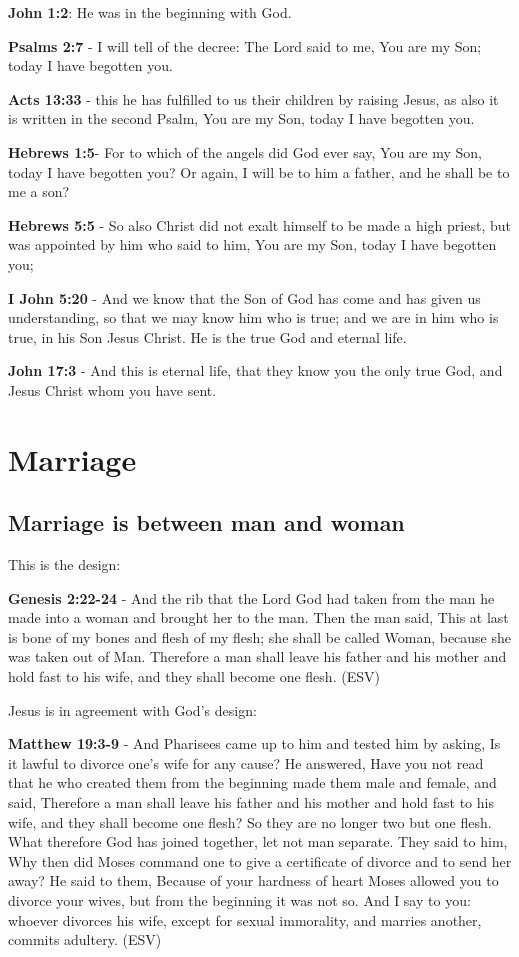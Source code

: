 \documentclass[11pt]{article}
\begin{document}
\textbf{John 1:2}: He was in the beginning with God.

\textbf{Psalms 2:7} - I will tell of the decree: The Lord said to me, You are my Son; today I have begotten you.

\textbf{Acts 13:33} - this he has fulfilled to us their children by raising Jesus, as also it is written in the second Psalm, You are my Son, today I have begotten you.

\textbf{Hebrews 1:5}- For to which of the angels did God ever say, You are my Son, today I have begotten you? Or again, I will be to him a father, and he shall be to me a son?

\textbf{Hebrews 5:5} - So also Christ did not exalt himself to be made a high priest, but was appointed by him who said to him, You are my Son, today I have begotten you;

\textbf{I John 5:20} - And we know that the Son of God has come and has given us understanding, so that we may know him who is true; and we are in him who is true, in his Son Jesus Christ. He is the true God and eternal life.

\textbf{John 17:3} - And this is eternal life, that they know you the only true God, and Jesus Christ whom you have sent.

\section{Marriage}
\label{sec:org69254a3}
\subsection{Marriage is between man and woman}
\label{sec:org084cb5d}
This is the design:

\textbf{Genesis 2:22-24} - And the rib that the Lord God had taken from the man he made into a woman and brought her to the man. Then the man said, This at last is bone of my bones and flesh of my flesh; she shall be called Woman, because she was taken out of Man. Therefore a man shall leave his father and his mother and hold fast to his wife, and they shall become one flesh. (ESV)

Jesus is in agreement with God's design:

\textbf{Matthew 19:3-9} - And Pharisees came up to him and tested him by asking, Is it lawful to divorce one's wife for any cause? He answered, Have you not read that he who created them from the beginning made them male and female, and said, Therefore a man shall leave his father and his mother and hold fast to his wife, and they shall become one flesh? So they are no longer two but one flesh. What therefore God has joined together, let not man separate. They said to him, Why then did Moses command one to give a certificate of divorce and to send her away? He said to them, Because of your hardness of heart Moses allowed you to divorce your wives, but from the beginning it was not so. And I say to you: whoever divorces his wife, except for sexual immorality, and marries another, commits adultery. (ESV)
\end{document}
